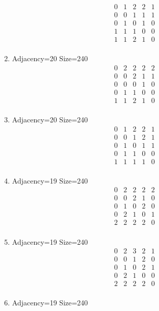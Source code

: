 \documentclass[12pt]{article}
\begin{document}
\begin{multicols}{3}
\begin{enumerate}
\begin{equation*}
\begin{array}{ccccc}
0&1&2&2&1\\
0&0&1&1&1\\
0&1&0&1&0\\
1&1&1&0&0\\
1&1&2&1&0\\
\end{array}
\end{equation*}
\item Adjacency=20 Size=240
\begin{equation*}
\begin{array}{ccccc}
0&2&2&2&2\\
0&0&2&1&1\\
0&0&0&1&0\\
0&1&1&0&0\\
1&1&2&1&0\\
\end{array}
\end{equation*}
\item Adjacency=20 Size=240
\begin{equation*}
\begin{array}{ccccc}
0&1&2&2&1\\
0&0&1&2&1\\
0&1&0&1&1\\
0&1&1&0&0\\
1&1&1&1&0\\
\end{array}
\end{equation*}
\item Adjacency=19 Size=240
\begin{equation*}
\begin{array}{ccccc}
0&2&2&2&2\\
0&0&2&1&0\\
0&1&0&2&0\\
0&2&1&0&1\\
2&2&2&2&0\\
\end{array}
\end{equation*}
\item Adjacency=19 Size=240
\begin{equation*}
\begin{array}{ccccc}
0&2&3&2&1\\
0&0&1&2&0\\
0&1&0&2&1\\
0&2&1&0&0\\
2&2&2&2&0\\
\end{array}
\end{equation*}
\item Adjacency=19 Size=240

\end{enumerate}
\end{multicols}
\end{document}
